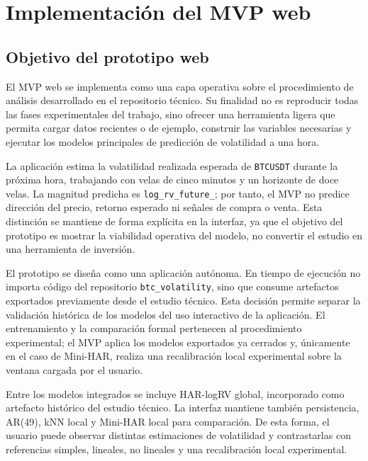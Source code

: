 
\chapter{Implementación del MVP web}\label{cap:mvp-web}

\section{Objetivo del prototipo web}\label{sec:objetivo-mvp}

El MVP web se implementa como una capa operativa sobre el procedimiento de análisis desarrollado en el repositorio técnico. Su finalidad no es reproducir todas las fases experimentales del trabajo, sino ofrecer una herramienta ligera que permita cargar datos recientes o de ejemplo, construir las variables necesarias y ejecutar los modelos principales de predicción de volatilidad a una hora.

La aplicación estima la volatilidad realizada esperada de \texttt{BTCUSDT} durante la próxima hora, trabajando con velas de cinco minutos y un horizonte de doce velas. La magnitud predicha es \texttt{log\_\allowbreak rv\_\allowbreak future\_}; por tanto, el MVP no predice dirección del precio, retorno esperado ni señales de compra o venta. Esta distinción se mantiene de forma explícita en la interfaz, ya que el objetivo del prototipo es mostrar la viabilidad operativa del modelo, no convertir el estudio en una herramienta de inversión.

El prototipo se diseña como una aplicación autónoma. En tiempo de ejecución no importa código del repositorio \texttt{btc\_\allowbreak volatility}, sino que consume artefactos exportados previamente desde el estudio técnico. Esta decisión permite separar la validación histórica de los modelos del uso interactivo de la aplicación. El entrenamiento y la comparación formal pertenecen al procedimiento experimental; el MVP aplica los modelos exportados ya cerrados y, únicamente en el caso de Mini-HAR, realiza una recalibración local experimental sobre la ventana cargada por el usuario.

Entre los modelos integrados se incluye HAR-logRV global, incorporado como artefacto histórico del estudio técnico. La interfaz mantiene también persistencia, AR(49), kNN local y Mini-HAR local para comparación. De esta forma, el usuario puede observar distintas estimaciones de volatilidad y contrastarlas con referencias simples, lineales, no lineales y una recalibración local experimental.


